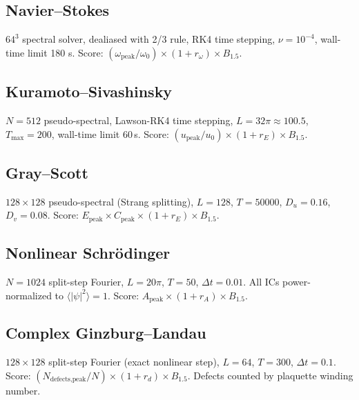 \documentclass[11pt]{article}
\begin{document}
\subsection{Navier--Stokes}
$64^3$ spectral solver, dealiased with 2/3 rule, RK4 time stepping,
$\nu=10^{-4}$, wall-time limit 180 s.
Score: $(\omega_\text{peak}/\omega_0)\times(1+r_\omega)\times B_{1.5}$.

\subsection{Kuramoto--Sivashinsky}
$N=512$ pseudo-spectral, Lawson-RK4 time stepping, $L=32\pi\approx100.5$,
$T_\text{max}=200$, wall-time limit 60\,s.
Score: $(u_\text{peak}/u_0)\times(1+r_E)\times B_{1.5}$.

\subsection{Gray--Scott}
$128\times128$ pseudo-spectral (Strang splitting), $L=128$, $T=50000$,
$D_u=0.16$, $D_v=0.08$.
Score: $E_\text{peak}\times C_\text{peak}\times(1+r_E)\times B_{1.5}$.

\subsection{Nonlinear Schr\"odinger}
$N=1024$ split-step Fourier, $L=20\pi$, $T=50$, $\Delta t=0.01$.
All ICs power-normalized to $\langle|\psi|^2\rangle=1$.
Score: $A_\text{peak}\times(1+r_A)\times B_{1.5}$.

\subsection{Complex Ginzburg--Landau}
$128\times128$ split-step Fourier (exact nonlinear step), $L=64$, $T=300$,
$\Delta t=0.1$.
Score: $(N_\text{defects,peak}/N)\times(1+r_d)\times B_{1.5}$.
Defects counted by plaquette winding number.
\end{document}
